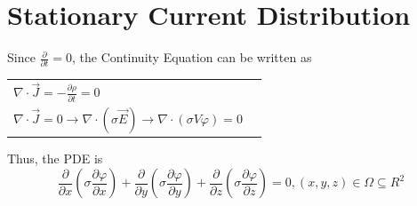 \section{Stationary Current Distribution}

Since $\frac{\partial}{\partial t} = 0$, the Continuity Equation can be written as

\begin{tabular}{ll}
	\(\displaystyle \nabla \cdot \vec{J} = -\frac{\partial \rho}{\partial t} =  0\) \\
	\(\displaystyle \nabla \cdot \vec{J} = 0 \rightarrow \nabla \cdot \left(\sigma \vec{E}\right) \rightarrow \nabla \cdot \left(\sigma V \varphi\right) = 0\) \\
\end{tabular}

Thus, the PDE is
\begin{equation*}
	\frac{\partial}{\partial x}\left(\sigma \frac{\partial \varphi}{\partial x}\right) +\frac{\partial}{\partial y}\left(\sigma \frac{\partial \varphi}{\partial y}\right)
	+\frac{\partial}{\partial z}\left(\sigma \frac{\partial \varphi}{\partial z}\right) = 0, \left(x,y,z\right) \in \Omega \subseteq R^2
\end{equation*}

